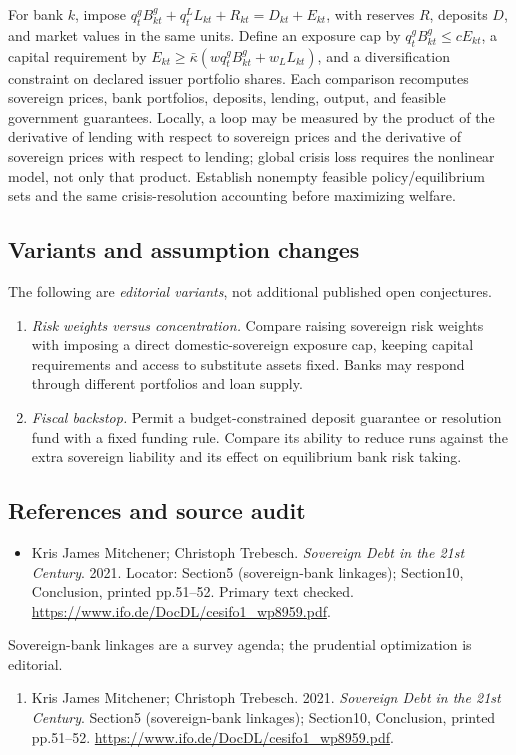 \documentclass[11pt,a4paper]{article}
\begin{document}
For bank \(k\), impose \(q_t^gB^g_{kt}+q_t^L L_{kt}+R_{kt}=D_{kt}+E_{kt}\), with reserves \(R\), deposits \(D\), and market values in the same units. Define an exposure cap by \(q_t^gB^g_{kt}\le cE_{kt}\), a capital requirement by \(E_{kt}\ge\bar\kappa(wq_t^gB^g_{kt}+w_LL_{kt})\), and a diversification constraint on declared issuer portfolio shares. Each comparison recomputes sovereign prices, bank portfolios, deposits, lending, output, and feasible government guarantees. Locally, a loop may be measured by the product of the derivative of lending with respect to sovereign prices and the derivative of sovereign prices with respect to lending; global crisis loss requires the nonlinear model, not only that product. Establish nonempty feasible policy/equilibrium sets and the same crisis-resolution accounting before maximizing welfare.
\subsection*{Variants and assumption changes}
The following are \emph{editorial variants}, not additional published open conjectures.
\begin{enumerate}
\item \emph{Risk weights versus concentration.} Compare raising sovereign risk weights with imposing a direct domestic-sovereign exposure cap, keeping capital requirements and access to substitute assets fixed. Banks may respond through different portfolios and loan supply.
\item \emph{Fiscal backstop.} Permit a budget-constrained deposit guarantee or resolution fund with a fixed funding rule. Compare its ability to reduce runs against the extra sovereign liability and its effect on equilibrium bank risk taking.
\end{enumerate}
\subsection*{References and source audit}
\begin{itemize}
\item Kris James Mitchener; Christoph Trebesch. \emph{Sovereign Debt in the 21st Century}. 2021. Locator: Section5 (sovereign-bank linkages); Section10, Conclusion, printed pp.51--52. Primary text checked. \url{https://www.ifo.de/DocDL/cesifo1_wp8959.pdf}.
\end{itemize}
Sovereign-bank linkages are a survey agenda; the prudential optimization is editorial.
\begin{enumerate}\raggedright
\item\hypertarget{definitions:source:30007536:1}{} Kris James Mitchener; Christoph Trebesch. 2021. \emph{Sovereign Debt in the 21st Century}. Section5 (sovereign-bank linkages); Section10, Conclusion, printed pp.51--52.
\url{https://www.ifo.de/DocDL/cesifo1_wp8959.pdf}.
\end{enumerate}
\end{document}

